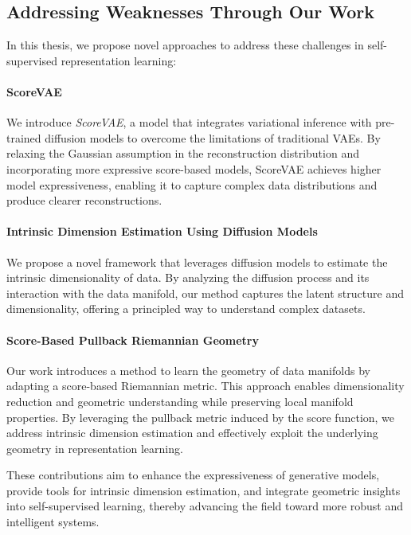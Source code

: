 
\subsection{Addressing Weaknesses Through Our Work}

In this thesis, we propose novel approaches to address these challenges in self-supervised representation learning:

\paragraph{ScoreVAE}

We introduce \emph{ScoreVAE}, a model that integrates variational inference with pre-trained diffusion models to overcome the limitations of traditional VAEs. By relaxing the Gaussian assumption in the reconstruction distribution and incorporating more expressive score-based models, ScoreVAE achieves higher model expressiveness, enabling it to capture complex data distributions and produce clearer reconstructions.

\paragraph{Intrinsic Dimension Estimation Using Diffusion Models}

We propose a novel framework that leverages diffusion models to estimate the intrinsic dimensionality of data. By analyzing the diffusion process and its interaction with the data manifold, our method captures the latent structure and dimensionality, offering a principled way to understand complex datasets.

\paragraph{Score-Based Pullback Riemannian Geometry}

Our work introduces a method to learn the geometry of data manifolds by adapting a score-based Riemannian metric. This approach enables dimensionality reduction and geometric understanding while preserving local manifold properties. By leveraging the pullback metric induced by the score function, we address intrinsic dimension estimation and effectively exploit the underlying geometry in representation learning.

These contributions aim to enhance the expressiveness of generative models, provide tools for intrinsic dimension estimation, and integrate geometric insights into self-supervised learning, thereby advancing the field toward more robust and intelligent systems.
